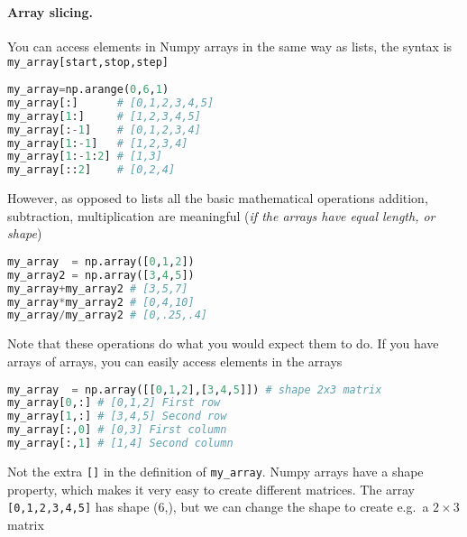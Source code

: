 \documentclass[graybox,sectrefs,envcountresetchap,open=right,final]{svmonodo}
\begin{document}
\paragraph{Array slicing.}
You can access elements in Numpy arrays in the same way as lists, the syntax is \Verb!my_array[start,stop,step]!








\begin{lstlisting}[language=python,style=blue1bar]
my_array=np.arange(0,6,1)
my_array[:]      # [0,1,2,3,4,5]
my_array[1:]     # [1,2,3,4,5]
my_array[:-1]    # [0,1,2,3,4]
my_array[1:-1]   # [1,2,3,4]
my_array[1:-1:2] # [1,3]
my_array[::2]    # [0,2,4]

\end{lstlisting}

However, as opposed to lists all the basic mathematical operations addition, subtraction, multiplication are meaningful (\emph{if the arrays have equal length, or shape})






\begin{lstlisting}[language=Python,style=gray]
my_array  = np.array([0,1,2])
my_array2 = np.array([3,4,5])
my_array+my_array2 # [3,5,7]
my_array*my_array2 # [0,4,10]
my_array/my_array2 # [0,.25,.4]

\end{lstlisting}

Note that these operations do what you would expect them to do. If you have arrays of arrays, you can easily access elements in the arrays






\begin{lstlisting}[language=Python,style=gray]
my_array  = np.array([[0,1,2],[3,4,5]]) # shape 2x3 matrix
my_array[0,:] # [0,1,2] First row
my_array[1,:] # [3,4,5] Second row
my_array[:,0] # [0,3] First column
my_array[:,1] # [1,4] Second column

\end{lstlisting}

Not the extra \texttt{[]} in the definition of \Verb!my_array!.  Numpy arrays have a shape property, which makes it very easy to create different matrices. The array \texttt{[0,1,2,3,4,5]} has shape (6,), but we can change the shape to create e.g.~a $2\times3$ matrix
\end{document}
